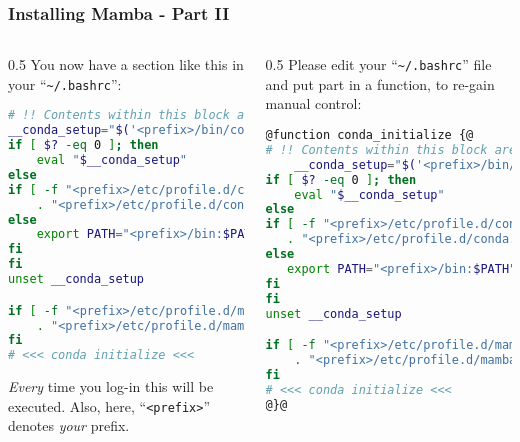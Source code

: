 \begin{frame}[fragile]
  \frametitle{Installing Mamba - Part II}
  \footnotesize
  \begin{columns}[t]
    \begin{column}{0.5\textwidth}
       You now have a section like this in your ``\texttt{\textasciitilde/.bashrc}'':
       \begin{lstlisting}[language=Bash, style=Shell, basicstyle=\tiny, breaklines=true]
# !! Contents within this block are managed by 'conda init' !!
__conda_setup="$('<prefix>/bin/conda' 'shell.bash' 'hook' 2> /dev/null)"
if [ $? -eq 0 ]; then
    eval "$__conda_setup"
else
if [ -f "<prefix>/etc/profile.d/conda.sh" ]; then
    . "<prefix>/etc/profile.d/conda.sh"
else
    export PATH="<prefix>/bin:$PATH"
fi
fi
unset __conda_setup

if [ -f "<prefix>/etc/profile.d/mamba.sh" ]; then
    . "<prefix>/etc/profile.d/mamba.sh"
fi
# <<< conda initialize <<<
      \end{lstlisting}
      \bcattention \emph{Every} time you log-in this will be executed. Also, here, ``\texttt{<prefix>}'' denotes \emph{your} prefix.
    \end{column}
    \begin{column}{0.5\textwidth}
       \pause
       {\footnotesize Please edit your ``\texttt{\textasciitilde/.bashrc}'' file and put part in a function, to re-gain manual control:}
       \begin{lstlisting}[language=Bash, style=Shell, basicstyle=\tiny, breaklines=true]
@function conda_initialize {@
# !! Contents within this block are managed by 'conda init' !!
    __conda_setup="$('<prefix>/bin/conda' 'shell.bash' 'hook' 2> /dev/null)"
if [ $? -eq 0 ]; then
    eval "$__conda_setup"
else
if [ -f "<prefix>/etc/profile.d/conda.sh" ]; then
   . "<prefix>/etc/profile.d/conda.sh"
else
   export PATH="<prefix>/bin:$PATH"
fi
fi
unset __conda_setup

if [ -f "<prefix>/etc/profile.d/mamba.sh" ]; then 
    . "<prefix>/etc/profile.d/mamba.sh"
fi
# <<< conda initialize <<<
@}@
      \end{lstlisting}
    \end{column}
  \end{columns}
\end{frame}


